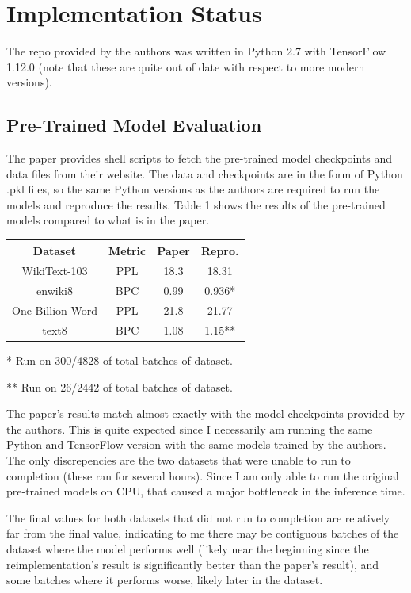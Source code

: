 \documentclass[11pt]{article}
\begin{document}
\section{Implementation Status}

The repo provided by the authors was written in Python 2.7 with TensorFlow 1.12.0 (note that these are quite out of date with respect to more modern versions).

\subsection{Pre-Trained Model Evaluation}

The paper provides shell scripts to fetch the pre-trained model checkpoints and data files from their website. The data and checkpoints are in the form of Python .pkl files, so the same Python versions as the authors are required to run the models and reproduce the results. Table 1 shows the results of the pre-trained models compared to what is in the paper.

\begin{center}
\begin{tabular}{ |c|c|c|c| }
 \hline
 Dataset & Metric & Paper & Repro. \\
 \hline
 WikiText-103 & PPL & 18.3 & 18.31 \\ 
 enwiki8 & BPC & 0.99 & 0.936* \\ 
 One Billion Word & PPL & 21.8 & 21.77 \\ 
 text8 & BPC & 1.08 & 1.15** \\
 \hline
\end{tabular}
\begin{tablenotes}
  \item[*] * Run on 300/4828 of total batches of dataset.
  \item[*] ** Run on 26/2442 of total batches of dataset.
  \end{tablenotes}
\end{center}

The paper's results match almost exactly with the model checkpoints provided by the authors. This is quite expected since I necessarily am running the same Python and TensorFlow version with the same models trained by the authors. The only discrepencies are the two datasets that were unable to run to completion (these ran for several hours). Since I am only able to run the original pre-trained models on CPU, that caused a major bottleneck in the inference time. 

The final values for both datasets that did not run to completion are relatively far from the final value, indicating to me there may be contiguous batches of the dataset where the model performs well (likely near the beginning since the reimplementation's result is significantly better than the paper's result), and some batches where it performs worse, likely later in the dataset.
\end{document}
